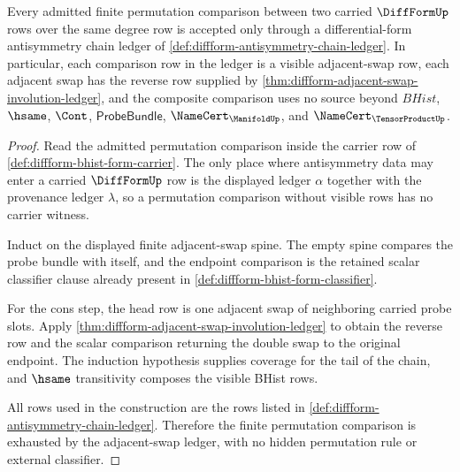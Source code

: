 \begin{theorem}
\label{thm:diffform-antisymmetry-chain-coverage}
\label{thm:diffform-antisymmetry-chain-ledger-well-formedness}
Every admitted finite permutation comparison between two carried
$\DiffFormUp$ rows over the same degree row is accepted only through a
differential-form antisymmetry chain ledger of
\autoref{def:diffform-antisymmetry-chain-ledger}. In particular, each
comparison row in the ledger is a visible adjacent-swap row, each adjacent
swap has the reverse row supplied by
\autoref{thm:diffform-adjacent-swap-involution-ledger}, and the composite
comparison uses no source beyond $BHist$, $\hsame$, $\Cont$,
$\mathsf{ProbeBundle}$, $\NameCert_{\ManifoldUp}$, and
$\NameCert_{\TensorProductUp}$.
\end{theorem}
\begin{proof}
Read the admitted permutation comparison inside the carrier row of
\autoref{def:diffform-bhist-form-carrier}. The only place where
antisymmetry data may enter a carried $\DiffFormUp$ row is the displayed
ledger $\alpha$ together with the provenance ledger $\lambda$, so a
permutation comparison without visible rows has no carrier witness.

Induct on the displayed finite adjacent-swap spine. The empty spine compares
the probe bundle with itself, and the endpoint comparison is the retained
scalar classifier clause already present in
\autoref{def:diffform-bhist-form-classifier}.

For the cons step, the head row is one adjacent swap of neighboring carried
probe slots. Apply
\autoref{thm:diffform-adjacent-swap-involution-ledger} to obtain the reverse
row and the scalar comparison returning the double swap to the original
endpoint. The induction hypothesis supplies coverage for the tail of the
chain, and $\hsame$ transitivity composes the visible BHist rows.

All rows used in the construction are the rows listed in
\autoref{def:diffform-antisymmetry-chain-ledger}. Therefore the finite
permutation comparison is exhausted by the adjacent-swap ledger, with no
hidden permutation rule or external classifier.
\end{proof}

